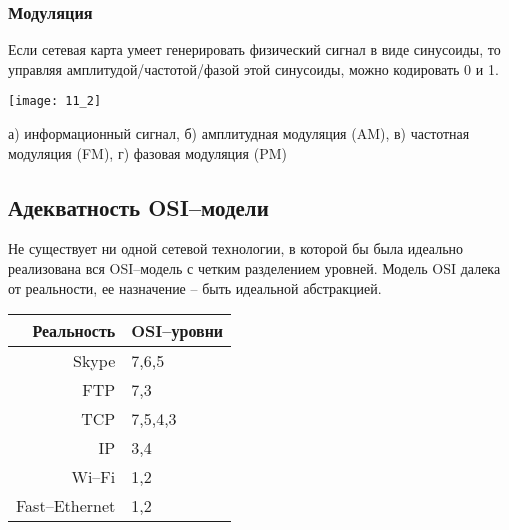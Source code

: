 \subsubsection{Модуляция}
Если сетевая карта умеет генерировать физический сигнал в виде синусоиды, то управляя амплитудой/частотой/фазой этой синусоиды, можно кодировать 0 и 1.
\\
\begin{minipage}{\textwidth}
\texttt{[image: 11\_2]}
\begin{center}
а) информационный сигнал, б) амплитудная модуляция (AM), в) частотная модуляция (FM), г) фазовая модуляция (PM)
\end{center}
\end{minipage}
\subsection{Адекватность OSI--модели}
Не существует ни одной сетевой технологии, в которой бы была идеально реализована вся OSI--модель с четким разделением уровней.
Модель OSI далека от реальности, ее назначение -- быть идеальной абстракцией.
\begin{table}[!h]
\begin{tabular}{r|l}
Реальность & OSI--уровни \\
\hline
Skype & 7,6,5 \\
\hline
FTP & 7,3 \\
\hline
TCP & 7,5,4,3 \\
\hline
IP & 3,4 \\
\hline
Wi--Fi & 1,2 \\
\hline
Fast--Ethernet & 1,2 \\
\end{tabular}
\end{table}
